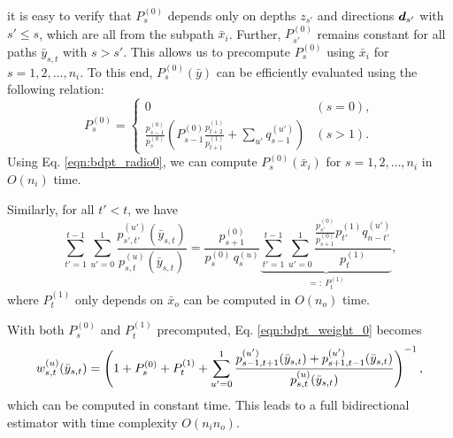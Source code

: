 it is easy to verify that $P^{(0)}_s$ depends only on depths $z_{s'}$ and directions $\bm{d}_{s'}$ with $s' \leq s$, which are all from the subpath $\bar{x}_i$.
Further, $P^{(0)}_{s'}$ remains constant for all paths $\bar{y}_{s,t}$ with $s > s'$.
This allows us to precompute $P^{(0)}_s$ using $\bar{x}_i$ for $s = 1, 2, \ldots, n_i$.
To this end, $P^{(0)}_s(\bar{y})$ can be efficiently evaluated using the following relation:
\begin{equation}
\label{eqn:bdpt_radio0}
P^{(0)}_s = \begin{cases}
0 & (s = 0),\\
\frac{p^{(0)}_{s - 1}}{p^{(0)}_s} \left( P^{(0)}_{s - 1} \frac{p^{(1)}_{t + 2}}{p^{(1)}_{t + 1}} + \sum_{u'} q^{(u')}_{s - 1} \right) & (s > 1).
\end{cases}
\end{equation}
Using Eq. \eqref{eqn:bdpt_radio0}, we can compute $P^{(0)}_s(\bar{x}_i)$ for $s = 1, 2, \ldots, n_i$ in $O(n_i)$ time.

Similarly, for all $t' < t$, we have
\begin{equation}
\label{eqn:bdpt_pdf_ratio_2}
\sum_{t' = 1}^{t - 1} \sum_{u' = 0}^1 \frac{p^{(u')}_{s', t'}(\bar{y}_{s,t})}{p^{(u)}_{s,t}(\bar{y}_{s,t})}
= \frac{p^{(0)}_{s + 1}}{p^{(0)}_s \, q^{(u)}_s}
\underbrace{\sum_{t' = 1}^{t - 1} \sum_{u' = 0}^1 \frac{\frac{p^{(0)}_{s'}}{p^{(0)}_{s + 1}} p^{(1)}_{t'} q^{(u')}_{n - t'}}{p^{(1)}_t}}_{=:\ P^{(1)}_t},
\end{equation}
where $P^{(1)}_t$ only depends on $\bar{x}_o$ can be computed in $O(n_o)$ time.

With both $P^{(0)}_s$ and $P^{(1)}_t$ precomputed, Eq. \eqref{eqn:bdpt_weight_0} becomes
\begin{equation}
\small
\label{eqn:bdpt_weight_1}
w^{(u)}_{s, t}(\bar{y}_{s,t})
= \left(1 + P^{(0)}_s + P^{(1)}_t +
\sum_{u'=0}^1 \frac{p^{(u')}_{s - 1, t + 1}(\bar{y}_{s,t}) + p^{(u')}_{s + 1, t - 1}(\bar{y}_{s,t})}{p^{(u)}_{s,t}(\bar{y}_{s,t})}\right)^{-1},
\end{equation}
which can be computed in constant time.
This leads to a full bidirectional estimator with time complexity $O(n_i n_o)$.
